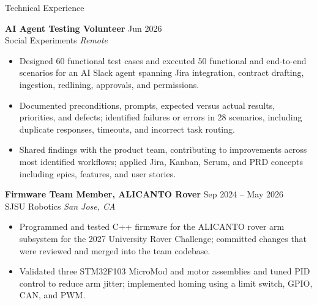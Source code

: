 \documentclass{resume}
\begin{document}
\begin{rSection}{Technical Experience}

\textbf{AI Agent Testing Volunteer} \hfill Jun 2026\\
Social Experiments \hfill \textit{Remote}
\begin{itemize}
    \itemsep -3pt {}
    \item Designed 60 functional test cases and executed 50 functional and end-to-end scenarios for an AI Slack agent spanning Jira integration, contract drafting, ingestion, redlining, approvals, and permissions.
    \item Documented preconditions, prompts, expected versus actual results, priorities, and defects; identified failures or errors in 28 scenarios, including duplicate responses, timeouts, and incorrect task routing.
    \item Shared findings with the product team, contributing to improvements across most identified workflows; applied Jira, Kanban, Scrum, and PRD concepts including epics, features, and user stories.
\end{itemize}

\textbf{Firmware Team Member, ALICANTO Rover} \hfill Sep 2024 -- May 2026\\
SJSU Robotics \hfill \textit{San Jose, CA}
\begin{itemize}
    \itemsep -3pt {}
    \item Programmed and tested C++ firmware for the ALICANTO rover arm subsystem for the 2027 University Rover Challenge; committed changes that were reviewed and merged into the team codebase.
    \item Validated three STM32F103 MicroMod and motor assemblies and tuned PID control to reduce arm jitter; implemented homing using a limit switch, GPIO, CAN, and PWM.
\end{itemize}

\end{rSection}
\end{document}

